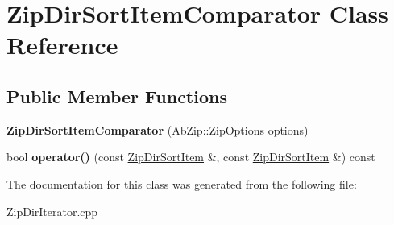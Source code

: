 \hypertarget{class_zip_dir_sort_item_comparator}{}\section{Zip\+Dir\+Sort\+Item\+Comparator Class Reference}
\label{class_zip_dir_sort_item_comparator}
\subsection*{Public Member Functions}
\begin{DoxyCompactItemize}
\item 
{\bfseries Zip\+Dir\+Sort\+Item\+Comparator} (Ab\+Zip\+::\+Zip\+Options options)\hypertarget{class_zip_dir_sort_item_comparator_a91d354f2477d6efc4be9b20780c7d4c7}{}\label{class_zip_dir_sort_item_comparator_a91d354f2477d6efc4be9b20780c7d4c7}

\item 
bool {\bfseries operator()} (const \hyperlink{struct_zip_dir_sort_item}{Zip\+Dir\+Sort\+Item} \&, const \hyperlink{struct_zip_dir_sort_item}{Zip\+Dir\+Sort\+Item} \&) const \hypertarget{class_zip_dir_sort_item_comparator_a453f42c724deef32b2254c09b446f095}{}\label{class_zip_dir_sort_item_comparator_a453f42c724deef32b2254c09b446f095}

\end{DoxyCompactItemize}


The documentation for this class was generated from the following file\+:\begin{DoxyCompactItemize}
\item 
Zip\+Dir\+Iterator.\+cpp\end{DoxyCompactItemize}
